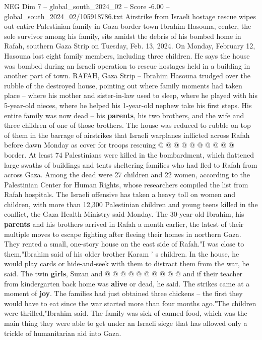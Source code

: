 \begin{textsample}{NEG Dim 7 – global\_south\_2024\_02 – Score -6.00 – global\_south\_2024\_02/105918786.txt}  \label{ex:f7_neg_393}
Airstrike from Israeli hostage rescue wipes out entire Palestinian family in Gaza border town Ibrahim Hasouna, center, the sole survivor among his family, sits amidst the debris of his bombed home in Rafah, southern Gaza Strip on Tuesday, Feb. 13, 2024.
On Monday, February 12, Hasouna lost eight family members, including three children.
He says the house was bombed during an Israeli operation to rescue hostages held in a building in another part of town.
RAFAH, Gaza Strip -- Ibrahim Hasouna trudged over the rubble of the destroyed house, pointing out where family moments had taken place -- where his mother and sister-in-law used to sleep, where he played with his 5-year-old nieces, where he helped his 1-year-old nephew take his first steps.
His entire family was now dead -- his \textbf{parents}, his two brothers, and the wife and three children of one of those brothers.
The house was reduced to rubble on top of them in the barrage of airstrikes that Israeli warplanes inflicted across Rafah before dawn Monday as cover for troops rescuing @ @ @ @ @ @ @ @ @ @ border.
At least 74 Palestinians were killed in the bombardment, which flattened large swaths of buildings and tents sheltering families who had fled to Rafah from across Gaza.
Among the dead were 27 children and 22 women, according to the Palestinian Center for Human Rights, whose researchers compiled the list from Rafah hospitals.
The Israeli offensive has taken a heavy toll on women and children, with more than 12,300 Palestinian children and young teens killed in the conflict, the Gaza Health Ministry said Monday.
The 30-year-old Ibrahim, his \textbf{parents} and his brothers arrived in Rafah a month earlier, the latest of their multiple moves to escape fighting after fleeing their homes in northern Gaza.
They rented a small, one-story house on the east side of Rafah."I was close to them,"Ibrahim said of his older brother Karam ' s children.
In the house, he would play cards or hide-and-seek with them to distract them from the war, he said.
The twin \textbf{girls}, Suzan and @ @ @ @ @ @ @ @ @ @ and if their teacher from kindergarten back home was \textbf{alive} or dead, he said.
The strikes came at a moment of \textbf{joy}.
The families had just obtained three chickens -- the first they would have to eat since the war started more than four months ago."The children were thrilled,"Ibrahim said.
The family was sick of canned food, which was the main thing they were able to get under an Israeli siege that has allowed only a trickle of humanitarian aid into Gaza.

\end{textsample}
